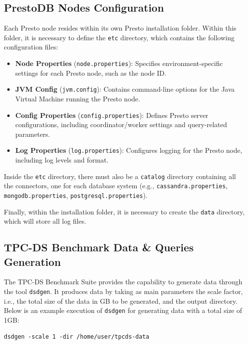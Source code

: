\documentclass[conference]{IEEEtran}
\begin{document}
\subsection{PrestoDB Nodes Configuration}

Each Presto node resides within its own Presto installation folder. Within this folder, it is necessary to define the \texttt{etc} directory, which contains the following configuration files:

\begin{itemize}
    \item \textbf{Node Properties} (\texttt{node.properties}): Specifies environment-specific settings for each Presto node, such as the node ID.
    \item \textbf{JVM Config} (\texttt{jvm.config}): Contains command-line options for the Java Virtual Machine running the Presto node.
    \item \textbf{Config Properties} (\texttt{config.properties}): Defines Presto server configurations, including coordinator/worker settings and query-related parameters.

    \item \textbf{Log Properties} (\texttt{log.properties}): Configures logging for the Presto node, including log levels and format.
\end{itemize}


Inside the \texttt{etc} directory, there must also be a \texttt{catalog} directory containing all the connectors, one for each database system (e.g., \texttt{cassandra.properties}, \texttt{mongodb.properties}, \texttt{postgresql.properties}).

Finally, within the installation folder, it is necessary to create the \texttt{data} directory, which will store all log files.


\subsection{TPC-DS Benchmark Data \& Queries Generation}

The TPC-DS Benchmark Suite provides the capability to generate data through the tool \texttt{dsdgen}. It produces data by taking as main parameters the scale factor, i.e., the total size of the data in GB to be generated, and the output directory. Below is an example execution of \texttt{dsdgen} for generating data with a total size of 1GB:

\begin{verbatim}
dsdgen -scale 1 -dir /home/user/tpcds-data
\end{verbatim}
\end{document}
